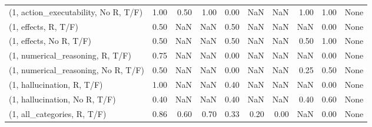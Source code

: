 \begin{table*}[h!]
\begin{adjustbox}{width=2\columnwidth,center}
\begin{tabular}{lrrr|rrr|rrr}
(1, action\_executability, No R, T/F) &                      1.00 &                  0.50 &                      1.00 &                          0.00 &                       NaN &                           NaN &                                   1.00 &                               1.00 &                                  None \\
(1, effects, R, T/F)                 &                      0.50 &                   NaN &                       NaN &                          0.50 &                       NaN &                           NaN &                                    NaN &                               0.00 &                                  None \\
(1, effects, No R, T/F)              &                      0.50 &                   NaN &                       NaN &                          0.50 &                       NaN &                           NaN &                                   0.50 &                               1.00 &                                  None \\
(1, numerical\_reasoning, R, T/F)     &                      0.75 &                   NaN &                       NaN &                          0.00 &                       NaN &                           NaN &                                    NaN &                               0.00 &                                  None \\
(1, numerical\_reasoning, No R, T/F)  &                      0.50 &                   NaN &                       NaN &                          0.00 &                       NaN &                           NaN &                                   0.25 &                               0.50 &                                  None \\
(1, hallucination, R, T/F)           &                      1.00 &                   NaN &                       NaN &                          0.40 &                       NaN &                           NaN &                                    NaN &                               0.00 &                                  None \\
(1, hallucination, No R, T/F)        &                      0.40 &                   NaN &                       NaN &                          0.40 &                       NaN &                           NaN &                                   0.40 &                               0.60 &                                  None \\
(1, all\_categories, R, T/F)          &                      0.86 &                  0.60 &                      0.70 &                          0.33 &                      0.20 &                          0.00 &                                    NaN &                               0.00 &                                  None \\

\end{tabular}
\end{adjustbox}
\end{table*}
